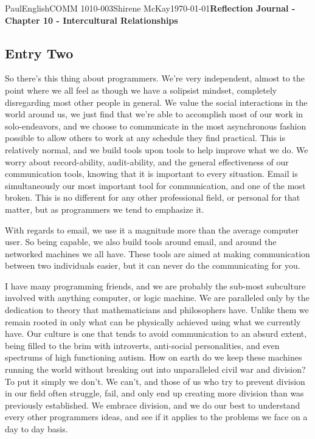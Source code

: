 \documentclass[12pt,letterpaper]{article}
\begin{document}
\begin{mla}{Paul}{English}{COMM 1010-003}{Shirene
    McKay}{\today}{\textbf{Reflection Journal - Chapter 10 - Intercultural Relationships}}
\subsection{Entry Two}

So there's this thing about programmers. We're very independent, almost to the point where we all feel as though we have a solipsist mindset, completely disregarding most other people in general. We value the social interactions in the world around us, we just find that we're able to accomplish most of our work in solo-endeavors, and we choose to communicate in the most asynchronous fashion possible to allow others to work at any schedule they find practical. This is relatively normal, and we build tools upon tools to help improve what we do. We worry about record-ability, audit-ability, and the general effectiveness of our communication tools, knowing that it is important to every situation. Email is simultaneously our most important tool for communication, and one of the most broken. This is no different for any other professional field, or personal for that matter, but as programmers we tend to emphasize it. 

With regards to email, we use it a magnitude more than the average computer user. So being capable, we also build tools around email, and around the networked machines we all have. These tools are aimed at making communication between two individuals easier, but it can never do the communicating for you. 

I have many programming friends, and we are probably the sub-most subculture involved with anything computer, or logic machine. We are paralleled only by the dedication to theory that mathematicians and philosophers have. Unlike them we remain rooted in only what can be physically achieved using what we currently have. Our culture is one that tends to avoid communication to an absurd extent, being filled to the brim with introverts, anti-social personalities, and even spectrums of high functioning autism. How on earth do we keep these machines running the world without breaking out into unparalleled civil war and division? To put it simply we don't. We can't, and those of us who try to prevent division in our field often struggle, fail, and only end up creating more division than was previously established. We embrace division, and we do our best to understand every other programmers ideas, and see if it applies to the problems we face on a day to day basis. 


\end{mla}
\end{document}
